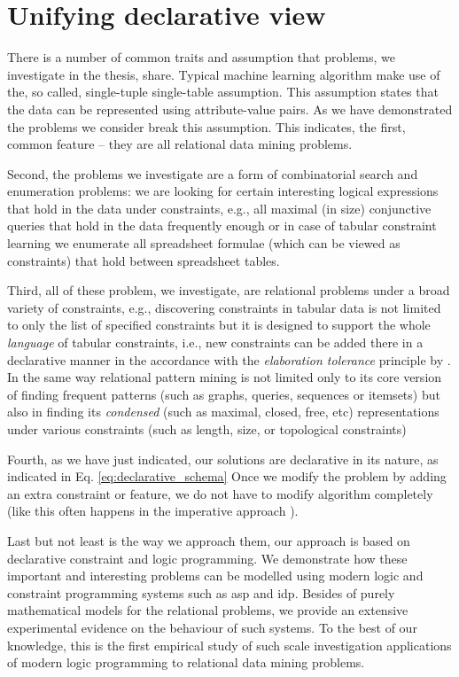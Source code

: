 \pubrev
\section{Unifying declarative view}
There is a number of common traits and assumption that problems, we
investigate in the thesis, share. Typical machine learning algorithm
make use of the, so called, single-tuple single-table assumption. This
assumption states that the data can be represented using
attribute-value pairs. As we have demonstrated the problems we
consider break this assumption. This indicates, the first, common
feature -- they are all relational data  mining problems. 

Second, the problems we investigate are a form of combinatorial search and
enumeration problems: we are looking for certain interesting logical
expressions that hold in the data under constraints, e.g., all maximal
(in size) conjunctive queries that hold in the data frequently enough
or in case of tabular constraint learning we enumerate all spreadsheet
formulae (which can be viewed as constraints) that hold between
spreadsheet tables.


Third, all of these problem, we investigate, are relational problems under a
broad variety of constraints, e.g., discovering constraints in tabular
data is not limited to only the list of specified constraints but it
is designed to support the whole \textit{language} of tabular
constraints, i.e., new constraints can be added there in a declarative
manner in the accordance with the \textit{elaboration tolerance}
principle by \textcite{elaboration_tolerance}. In the same way
relational pattern mining is not limited only to its core version of
finding frequent patterns (such as graphs, queries, sequences or
itemsets) but also in finding its \textit{condensed} (such as maximal,
closed, free, etc) representations
under various constraints (such as length, size, or topological
constraints)

Fourth, as we have just indicated, our solutions are declarative in
its nature, as indicated in Eq. \ref{eq:declarative_schema} Once we modify the problem by adding an extra constraint or feature, we do not have to modify algorithm completely (like this often happens in the imperative approach \parencite{gspan,clospan}).

Last but not least is the way we approach them, our approach is based
on declarative constraint and logic programming. We demonstrate how
these important and interesting problems can be modelled using modern
logic and constraint programming systems such as \acrshort{asp} and \acrshort{idp}. Besides of purely mathematical models for the relational problems, we provide an extensive experimental evidence on the behaviour of such systems. To the best of our knowledge, this is the first empirical study of such scale investigation applications of modern logic programming to relational data mining problems.
\pubrevend


